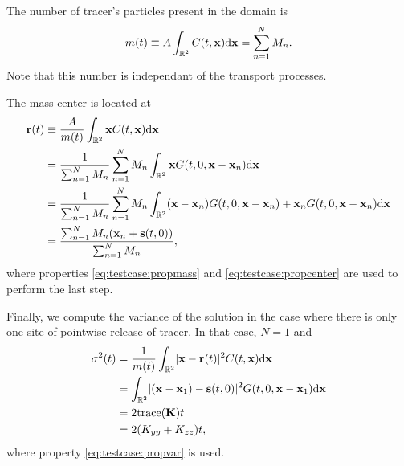 The number of tracer's particles present in the domain is
\begin{equation}
	m(t) \equiv A \int_{\R[2]} C(t,\b x) \rm d \b x = \sum_{n=1}^{N} M_n.
\end{equation}
Note that this number is independant of the transport processes.

The mass center is located at
\begin{align}
	\b r(t) &\equiv \frac{A}{m(t)} \int_{\R[2]} \b x C(t,\b x) \rm d \b x \nonumber \\
	&= \frac{1}{\sum_{n=1}^N M_n} \sum_{n=1}^N M_n \int_{\R[2]} \b x G(t,0,\b x - \b x_n) \rm d \b x \nonumber\\
	&= \frac{1}{\sum_{n=1}^N M_n} \sum_{n=1}^N M_n \int_{\R[2]} (\b x-\b x_n) G(t,0,\b x - \b x_n) + \b x_n G(t,0,\b x - \b x_n) \rm d \b x\nonumber\\
	&= \frac{\sum_{n=1}^{N} M_n (\b x_n + \b s(t,0))}{\sum_{n=1}^{N} M_n},
\end{align}
where properties \eqref{eq:testcase:propmass} and \eqref{eq:testcase:propcenter} are used to perform the last step.

Finally, we compute the variance of the solution in the case where there is only one site of pointwise release of tracer. In that case, $N = 1$ and
\begin{align}
	\sigma^2(t) &= \frac{1}{m(t)} \int_{\R[2]} \lvert \b x - \b r(t) \rvert^2 C(t,\b x) \rm d \b x \nonumber \\
	&= \int_{\R[2]} \lvert (\b x - \b x_1) - \b s(t,0)\rvert^2 G(t,0,\b x - \b x_1) \rm d \b x \nonumber \\
	&= 2 \mathrm{trace}(\b K)t \nonumber \\
	&= 2(K_{yy}+K_{zz})t,
\end{align}
where property \eqref{eq:testcase:propvar} is used.
